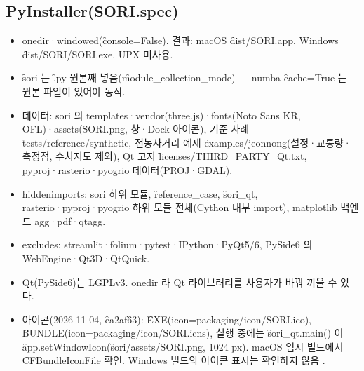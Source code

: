 \documentclass[10.5pt,a4paper]{article}
\begin{document}
\subsection{PyInstaller(\f{SORI.spec})}
\begin{itemize}
\item onedir·windowed(\f{console=False}). 결과: macOS \f{dist/SORI.app}, Windows \f{dist/SORI/SORI.exe}. UPX 미사용.
\item \f{sori} 는 \f{.py} 원본째 넣음(\f{module\_collection\_mode}) — numba \f{cache=True} 는 원본 파일이 있어야 동작.
\item 데이터: sori 의 templates·vendor(three.js)·fonts(Noto Sans KR, OFL)·assets(\f{SORI.png}, 창·Dock 아이콘), 기준 사례 \f{tests/reference/synthetic}, 전농사거리 예제 \f{examples/jeonnong}(설정·교통량·측정점, 수치지도 제외), Qt 고지 \f{licenses/THIRD\_PARTY\_Qt.txt}, pyproj·rasterio·pyogrio 데이터(PROJ·GDAL).
\item hiddenimports: sori 하위 모듈, \f{reference\_case}, \f{sori\_qt}, rasterio·pyproj·pyogrio 하위 모듈 전체(Cython 내부 import), matplotlib 백엔드 agg·pdf·qtagg.
\item excludes: streamlit·folium·pytest·IPython·PyQt5/6, PySide6 의 WebEngine·Qt3D·QtQuick.
\item Qt(PySide6)는 LGPLv3. onedir 라 Qt 라이브러리를 사용자가 바꿔 끼울 수 있다.
\item 아이콘(2026-11-04, \f{ea2af63}): \f{EXE(icon=packaging/icon/SORI.ico)}, \f{BUNDLE(icon=packaging/icon/SORI.icns)}, 실행 중에는 \f{sori\_qt.main()} 이 \f{app.setWindowIcon}(\f{sori/assets/SORI.png}, 1024 px). macOS 임시 빌드에서 \f{CFBundleIconFile} 확인. Windows 빌드의 아이콘 표시는 확인하지 않음 \chk.
\end{itemize}
\end{document}
